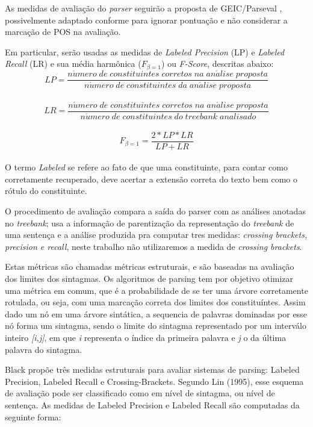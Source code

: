 As medidas de avaliação do \emph{parser} seguirão a proposta de GEIC/Parseval \cite{black91}, possivelmente adaptado conforme \cite{collins97} para ignorar pontuação e não considerar a marcação de POS na avaliação. 

Em particular, serão usadas as medidas de \emph{Labeled Precision} (LP) e \emph{Labeled Recall} (LR) e sua média harmônica ($F_{\beta=1}$) ou \emph{F-Score}, descritas abaixo:
\\
$$LP = \frac{n\acute{u}mero\; de\; constituintes\; corretos\; na\; an\acute{a}lise\; proposta}{n\acute{u}mero\; de\; constituintes\; da\; an\acute{a}lise\; proposta}$$
\\
$$LR = \frac{n\acute{u}mero\; de\; constituintes\; corretos\; na\; an\acute{a}lise\; proposta}{n\acute{u}mero\; de\; constituintes\; do\; \mathit{treebank}\; analisado}$$
\\
$$F_{\beta=1} = \frac{2*LP*LR}{LP+LR}$$
\\
O termo \emph{Labeled} se refere ao fato de que uma constituinte, para contar como corretamente recuperado, deve acertar a extensão correta do texto bem como o rótulo do constituinte.

O procedimento de avaliação compara a saída do parser com as análises anotadas no \emph{treebank}; usa a informação de parentização da representação do \emph{treebank} de uma sentença e a análise produzida pra computar tres medidas: \emph{crossing brackets, precision e recall}, neste trabalho não utilizaremos a medida de \emph{crossing brackets}.

Estas métricas são chamadas métricas estruturais, e são baseadas na avaliação dos limites dos sintagmas. Os algoritmos de parsing tem por objetivo otimizar uma métrica em comum, que é a probabilidade de se ter uma árvore corretamente rotulada, ou seja, com uma marcação correta dos limites dos constituíntes. Assim dado um nó em uma árvore sintática, a sequencia de palavras dominadas por esse nó forma um sintagma, sendo o limite do sintagma representado por um interválo inteiro \emph{[i,j]}, em que \emph{i} representa o índice da primeira palavra e \emph{j} o da última palavra do sintagma.

Black \cite{black91} propõe três medidas estruturais para avaliar sistemas de parsing: Labeled Precision, Labeled Recall e Crossing-Brackets. Segundo Lin (1995), esse esquema de avaliação pode ser classificado como em nível de sintagma, ou nível de sentença. 
As medidas de Labeled Precision e Labeled Recall são computadas da seguinte forma:

